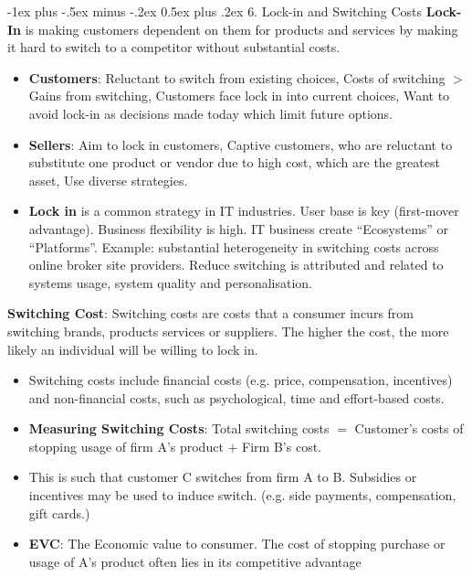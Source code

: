 \documentclass[12pt, landscape]{article}
\makeatletter
\renewcommand{\section}{\@startsection{section}{1}{0mm}%
                                {-1ex plus -.5ex minus -.2ex}%
                                {0.5ex plus .2ex}%
                                {\normalfont\large\bfseries}}
\makeatother
\begin{document}
\begin{multicols*}{3}
\section{6. Lock-in and Switching Costs}
\textbf{Lock-In} is making customers dependent on them for products and services by making it hard to switch to a competitor without substantial costs.
\begin{itemize}
\item \textbf{Customers}: Reluctant to switch from existing choices, Costs of switching $>$ Gains from switching, Customers face lock in into current choices, Want to avoid lock-in as decisions made today which limit future options.
\item \textbf{Sellers}: Aim to lock in customers, Captive customers, who are reluctant to substitute one product or vendor due to high cost, which are the greatest asset, Use diverse strategies.
\item \textbf{Lock in} is a common strategy in IT industries. User base is key (first-mover advantage). Business flexibility is high. IT business create “Ecosystems” or “Platforms”. Example: substantial heterogeneity in switching costs across online broker site providers. Reduce switching is attributed and related to systems usage, system quality and personalisation.
\end{itemize}
\textbf{Switching Cost}: Switching costs are costs that a consumer incurs from switching brands, products services or suppliers. The higher the cost, the more likely an individual will be willing to lock in.
\begin{itemize}
\item Switching costs include financial costs (e.g. price, compensation, incentives) and non-financial costs, such as psychological, time and effort-based costs.
\item \textbf{Measuring Switching Costs}: Total switching costs $=$ Customer’s costs of stopping usage of firm A’s product $+$ Firm B’s cost. 
\item This is such that customer C switches from firm A to B. Subsidies or incentives may be used to induce switch. (e.g. side payments, compensation, gift cards.)
\item \textbf{EVC}: The Economic value to consumer. The cost of stopping purchase or usage of A’s product often lies in its competitive advantage
\end{itemize}

\end{multicols*}
\end{document}
